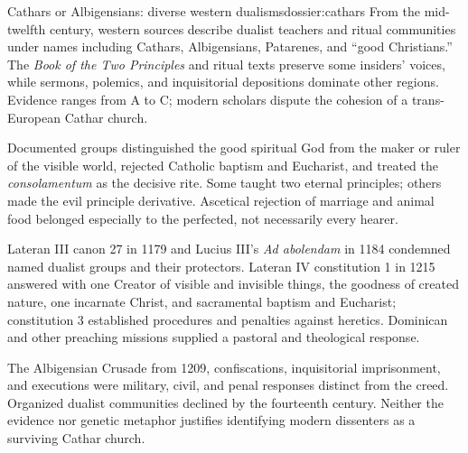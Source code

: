 \begin{heresydossier}{Cathars or Albigensians: diverse western dualisms}{dossier:cathars}
\objectfield From the mid-twelfth century, western sources describe dualist teachers and ritual communities under names including Cathars, Albigensians, Patarenes, and ``good Christians.'' The \emph{Book of the Two Principles} and ritual texts preserve some insiders' voices, while sermons, polemics, and inquisitorial depositions dominate other regions. Evidence ranges from A to C; modern scholars dispute the cohesion of a trans-European Cathar church.

\propositionfield Documented groups distinguished the good spiritual God from the maker or ruler of the visible world, rejected Catholic baptism and Eucharist, and treated the \emph{consolamentum} as the decisive rite. Some taught two eternal principles; others made the evil principle derivative. Ascetical rejection of marriage and animal food belonged especially to the perfected, not necessarily every hearer.

\responsefield Lateran III canon 27 in 1179 and Lucius III's \emph{Ad abolendam} in 1184 condemned named dualist groups and their protectors. Lateran IV constitution 1 in 1215 answered with one Creator of visible and invisible things, the goodness of created nature, one incarnate Christ, and sacramental baptism and Eucharist; constitution 3 established procedures and penalties against heretics. Dominican and other preaching missions supplied a pastoral and theological response.

\aftermathfield The Albigensian Crusade from 1209, confiscations, inquisitorial imprisonment, and executions were military, civil, and penal responses distinct from the creed. Organized dualist communities declined by the fourteenth century. Neither the evidence nor genetic metaphor justifies identifying modern dissenters as a surviving Cathar church.
\end{heresydossier}

